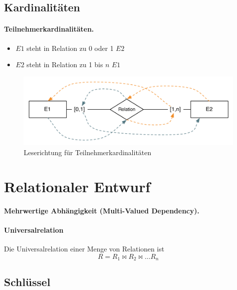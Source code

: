 \documentclass[]{scrartcl}
\begin{document}
\subsection{Kardinalit\"aten}

\paragraph{Teilnehmerkardinalit\"aten.}
\begin{itemize}
\item $E1$ steht in Relation zu 0 oder 1 $E2$
\item $E2$ steht in Relation zu 1 bis $n$ $E1$
\end{itemize}


\begin{figure}[htbp]
\begin{center}
\includegraphics[scale=0.7]{figures/Teilnehmerkardinalitaet.pdf}
\caption{Leserichtung f\"ur Teilnehmerkardinalit\"aten}
\label{default}
\end{center}
\end{figure}




\section{Relationaler Entwurf}

\paragraph{Mehrwertige Abh\"angigkeit (Multi-Valued Dependency).}


\paragraph{Universalrelation} Die Universalrelation einer Menge von Relationen ist
$$R = R_{1} \bowtie R_{2} \bowtie \dots R_{n}$$


\subsection{Schl\"ussel}
\end{document}
